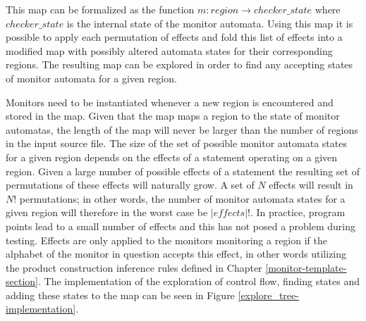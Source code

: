 \noindent This map can be formalized as the function $m: region \rightarrow { checker\_state }$ where $ checker\_state $ is the internal state of the monitor automata. Using this map it is possible to apply each permutation of effects and fold this list of effects into a modified map with possibly altered automata states for their corresponding regions. The resulting map can be explored in order to find any accepting states of monitor automata for a given region. 

\newpar Monitors need to be instantiated whenever a new region is encountered and stored in the map. Given that the map maps a region to the state of monitor automatas, the length of the map will never be larger than the number of regions in the input source file. The size of the set of possible monitor automata states for a given region depends on the effects of a statement operating on a given region. Given a large number of possible effects of a statement the resulting set of permutations of these effects will naturally grow. A set of $N$ effects will result in $N!$ permutations; in other words, the number of monitor automata states for a given region will therefore in the worst case be $|\mathit{effects}|!$. In practice, program points lead to a small number of effects and this has not posed a problem during testing. Effects are only applied to the monitors monitoring a region if the alphabet of the monitor in question accepts this effect, in other words utilizing the product construction inference rules defined in Chapter \ref{monitor-template-section}. The implementation of the exploration of control flow, finding states and adding these states to the map can be seen in Figure \ref{explore_tree-implementation}.

